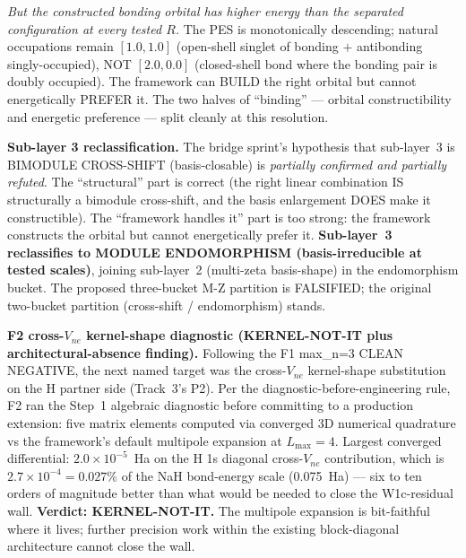 \documentclass[aps,pra,twocolumn,superscriptaddress,longbibliography]{revtex4-2}
\begin{document}
\emph{But the constructed bonding orbital has higher energy than the
separated configuration at every tested $R$.} The PES is monotonically
descending; natural occupations remain $[1.0, 1.0]$ (open-shell
singlet of bonding $+$ antibonding singly-occupied), NOT $[2.0, 0.0]$
(closed-shell bond where the bonding pair is doubly occupied). The
framework can BUILD the right orbital but cannot energetically
PREFER it. The two halves of ``binding'' --- orbital constructibility
and energetic preference --- split cleanly at this resolution.

\textbf{Sub-layer 3 reclassification.} The bridge sprint's hypothesis
that sub-layer~3 is BIMODULE CROSS-SHIFT (basis-closable) is
\emph{partially confirmed and partially refuted}. The ``structural''
part is correct (the right linear combination IS structurally a bimodule
cross-shift, and the basis enlargement DOES make it constructible). The
``framework handles it'' part is too strong: the framework constructs
the orbital but cannot energetically prefer it. \textbf{Sub-layer~3
reclassifies to MODULE ENDOMORPHISM (basis-irreducible at tested
scales)}, joining sub-layer~2 (multi-zeta basis-shape) in the
endomorphism bucket. The proposed three-bucket M-Z partition is
FALSIFIED; the original two-bucket partition (cross-shift / endomorphism)
stands.

\textbf{F2 cross-$V_{ne}$ kernel-shape diagnostic (KERNEL-NOT-IT plus
architectural-absence finding).} Following the F1 max\_n=3 CLEAN NEGATIVE,
the next named target was the cross-$V_{ne}$ kernel-shape substitution on
the H partner side (Track~3's P2). Per the diagnostic-before-engineering
rule, F2 ran the Step~1 algebraic diagnostic before committing to a
production extension: five matrix elements computed via converged
3D numerical quadrature vs the framework's default multipole expansion at
$L_\text{max}=4$. Largest converged differential: $2.0\times 10^{-5}$~Ha
on the H 1s diagonal cross-$V_{ne}$ contribution, which is $2.7\times 10^{-4}
= 0.027\%$ of the NaH bond-energy scale (0.075~Ha) --- six to ten orders of
magnitude better than what would be needed to close the W1c-residual wall.
\textbf{Verdict: KERNEL-NOT-IT.} The multipole expansion is bit-faithful where
it lives; further precision work within the existing block-diagonal
architecture cannot close the wall.
\end{document}
